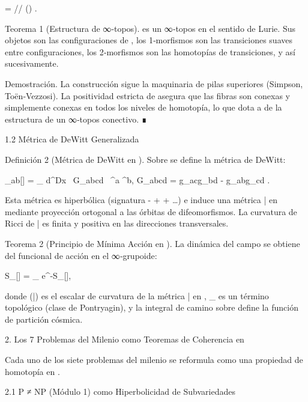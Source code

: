 \documentclass[12pt,a4paper]{book}
\begin{document}
 =  /\!/ () .

Teorema 1 (Estructura de ∞‑topos).    es un ∞‑topos en el sentido de Lurie. Sus objetos son las configuraciones de  \rho , los 1‑morfismos son las transiciones suaves entre configuraciones, los 2‑morfismos son las homotopías de transiciones, y así sucesivamente.

Demostración. La construcción sigue la maquinaria de pilas superiores (Simpson, Toën‑Vezzosi). La positividad estricta de  \rho  asegura que las fibras son conexas y simplemente conexas en todos los niveles de homotopía, lo que dota a    de la estructura de un ∞‑topos conectivo. ∎

1.2 Métrica de DeWitt Generalizada

Definición 2 (Métrica de DeWitt en   ). Sobre    se define la métrica de DeWitt:

_{ab}[\rho] = \int_{} d^Dx  \, G_{abcd} \, \delta\rho^a \delta\rho^b,
\quad G_{abcd} = g_{ac}g_{bd} - g_{ab}g_{cd} .

Esta métrica es hiperbólica (signatura  - + + \dots ) e induce una métrica  \bar{}  en    mediante proyección ortogonal a las órbitas de difeomorfismos. La curvatura de Ricci de  \bar{}  es finita y positiva en las direcciones transversales.

Teorema 2 (Principio de Mínima Acción en   ). La dinámica del campo  \rho  se obtiene del funcional de acción en el ∞‑grupoide:

S_{}[\rho] = \int_{} \rho {} e^{-S_{}[\rho]},

donde  (\bar{})  es el escalar de curvatura de la métrica  \bar{}  en   ,  _{}  es un término topológico (clase de Pontryagin), y la integral de camino sobre    define la función de partición cósmica.

2. Los 7 Problemas del Milenio como Teoremas de Coherencia en   

Cada uno de los siete problemas del milenio se reformula como una propiedad de homotopía en   .

2.1 P ≠ NP (Módulo 1) como Hiperbolicidad de Subvariedades
\end{document}
